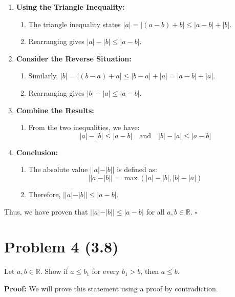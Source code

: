 \documentclass{article}
\begin{document}
\begin{enumerate}
    \item \textbf{Using the Triangle Inequality:}
    \begin{enumerate}
        \item The triangle inequality states $|a| = |(a - b) + b| \leq |a - b| + |b|$.
        \item Rearranging gives $|a| - |b| \leq |a - b|$.
    \end{enumerate}
    
    \item \textbf{Consider the Reverse Situation:}
    \begin{enumerate}
        \item Similarly, $|b| = |(b - a) + a| \leq |b - a| + |a| = |a - b| + |a|$.
        \item Rearranging gives $|b| - |a| \leq |a - b|$.
    \end{enumerate}
    
    \item \textbf{Combine the Results:}
    \begin{enumerate}
        \item From the two inequalities, we have:
        $$
        |a| - |b| \leq |a - b| \quad \text{and} \quad |b| - |a| \leq |a - b|
        $$
    \end{enumerate}
    
    \item \textbf{Conclusion:}
    \begin{enumerate}
        \item The absolute value $||a| - |b||$ is defined as:
        $$
        ||a| - |b|| = \max(|a| - |b|, |b| - |a|)
        $$
        \item Therefore, $||a| - |b|| \leq |a - b|$.
    \end{enumerate}
\end{enumerate}

Thus, we have proven that $||a|-|b||\leq|a-b|$ for all $a,b \in \mathbb{R}$. $\square$

\section*{Problem 4 (3.8)}
Let $a,b \in \mathbb{R}$. Show if $a\leq b_{1}$ for every $b_{1} > b$, then $a\leq b$.

\textbf{Proof:}
We will prove this statement using a proof by contradiction.
\end{document}
